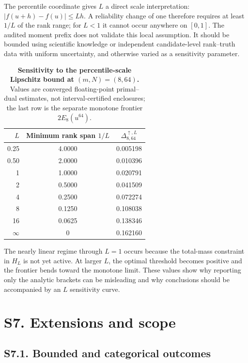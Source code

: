 The percentile coordinate gives $L$ a direct scale interpretation:
$|f(u+h)-f(u)|\le Lh$. A reliability change of one therefore requires at
least $1/L$ of the rank range; for $L<1$ it cannot occur anywhere on
$[0,1]$. The audited moment prefix does not validate this local assumption.
It should be bounded using scientific knowledge or independent candidate-level
rank--truth data with uniform uncertainty, and otherwise varied as a
sensitivity parameter.

\begin{table}[h]
\centering
\caption{\textbf{Sensitivity to the percentile-scale Lipschitz bound at $(m,N)=(8,64)$.} Values are converged floating-point primal--dual estimates, not interval-certified enclosures; the last row is the separate monotone frontier $2E_8(u^{64})$.}
\label{si:tab:lipschitz-sensitivity}
\begin{tabular}{rcc}
\toprule
$L$ & Minimum rank span $1/L$ & $\Delta^{\uparrow,L}_{8,64}$ \\
\midrule
0.25 & 4.0000 & 0.005198 \\
0.50 & 2.0000 & 0.010396 \\
1    & 1.0000 & 0.020791 \\
2    & 0.5000 & 0.041509 \\
4    & 0.2500 & 0.072274 \\
8    & 0.1250 & 0.108038 \\
16   & 0.0625 & 0.138346 \\
$\infty$ & 0 & 0.162160 \\
\bottomrule
\end{tabular}
\end{table}

The nearly linear regime through $L=1$ occurs because the total-mass
constraint in $H_L$ is not yet active. At larger $L$, the optimal threshold
becomes positive and the frontier bends toward the monotone limit. These
values show why reporting only the analytic brackets can be misleading and
why conclusions should be accompanied by an $L$ sensitivity curve.

\section*{S7. Extensions and scope}

\subsection*{S7.1. Bounded and categorical outcomes}

